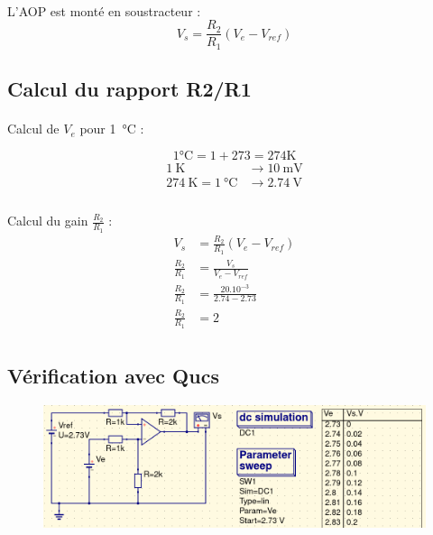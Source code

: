 \documentclass{article}
\begin{document}
\paragraph{}L'AOP est monté en soustracteur :
$$V_s = \frac{R_2}{R_1}\left(V_e - V_{ref}\right)$$

\subsection{Calcul du rapport R2/R1}
\paragraph{} Calcul de $V_e$ pour \SI{1}{\celsius} :

$$1\si{\celsius} = 1 + 273 = 274\si{\kelvin}$$
\begin{align*}
    \SI{1}{\kelvin} &\to \SI{10}{\milli\volt}\\
    \SI{274}{\kelvin} = \SI{1}{\celsius} &\to \SI{2.74}{\volt}\\
\end{align*}

\paragraph{} Calcul du gain $\frac{R_2}{R_1}$ :
\begin{align*}
    V_s &= \frac{R_2}{R_1}\left(V_e - V_{ref}\right)\\
    \frac{R_2}{R_1} &= \frac{V_s}{V_e - V_{ref}}\\
    \frac{R_2}{R_1} &= \frac{20.10^{-3}}{2.74 - 2.73}\\
    \frac{R_2}{R_1} &= 2\\
\end{align*}

\subsection{Vérification avec Qucs}

\begin{figure}[H]
    \centering
    \includegraphics[width=\linewidth]{./images/AOP2-res.png}
\end{figure}
\end{document}
